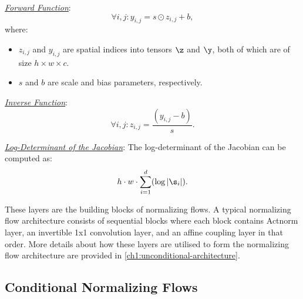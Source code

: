 \smallskip

\textit{\underline{Forward Function}}:
\[
\forall i,j : y_{i,j} = s \odot z_{i,j} + b,
\]
where:
\begin{itemize}
    \item \(z_{i,j}\) and \(y_{i,j}\) are spatial indices into tensors \(\z\) and \(\y\), both of which are of size $h \times w \times c$.
    \item \(s\) and \(b\) are scale and bias parameters, respectively.
\end{itemize}

\textit{\underline{Inverse Function}}:
\[
\forall i,j : z_{i,j} = \frac{(y_{i,j} - b)}{s}.
\]

\textit{\underline{Log-Determinant of the Jacobian}}: The log-determinant of the Jacobian can be computed as:
\[
h \cdot w \cdot \sum_{i=1}^{d}(\log |\s_i|).
\]

These layers are the building blocks of normalizing flows. A typical normalizing flow architecture consists of sequential blocks where each block contains Actnorm layer, an invertible 1x1 convolution layer, and an affine coupling layer in that order. More details about how these layers are utilised to form the normalizing flow architecture are provided in \ref{ch1:unconditional-architecture}.

\subsection{Conditional Normalizing Flows}

